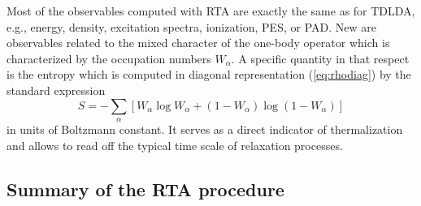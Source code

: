 \documentclass[final,1p]{elsarticle}
\begin{document}
Most of the observables computed with RTA are exactly the same as for
TDLDA, e.g., energy, density, excitation spectra, ionization, PES, or PAD.
New are observables related to the mixed character of the
one-body operator which is characterized by the occupation
numbers $W_\alpha$. 
A specific quantity in that respect is the 
entropy which is computed in diagonal representation
(\ref{eq:rhodiag}) by the standard expression \cite{Rei98aB}
\begin{equation}
  S
  =
  - \sum_\alpha\left[
    W_\alpha\log W_\alpha
    +
    (1\!-\!W_\alpha)\log (1\!-\!W_\alpha)
  \right]
\label{eq:entropy}
\end{equation}
in units of Boltzmann constant. 
It serves as a direct indicator of thermalization and allows to 
read off the typical time scale of relaxation processes. 



\subsection{Summary of the RTA procedure}
\label{sec:summaryRTA}
\end{document}
